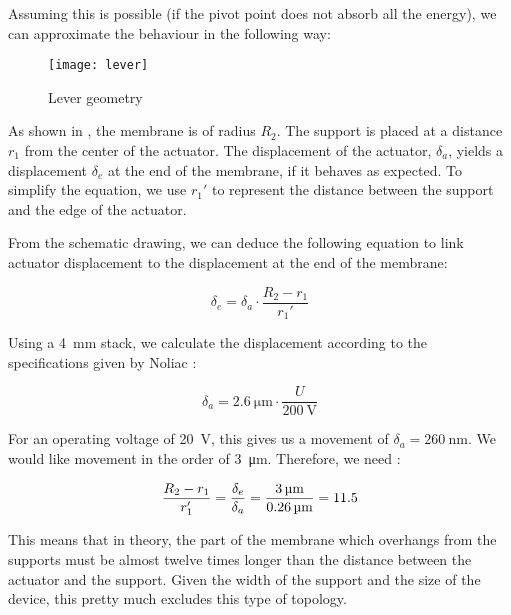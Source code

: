 Assuming this is possible (if the pivot point does not absorb all the energy),
we can approximate the behaviour in the following way:

\begin{figure}[h]
  \begin{center}
    \texttt{[image: lever]}
  \end{center}
  \caption{Lever geometry}
  \label{fig:lever}
\end{figure}

As shown in , the membrane is of radius $R_2$. The support is
placed at a distance $r_1$ from the center of the actuator.  The displacement of
the actuator, $\delta_a$, yields a displacement $\delta_e$ at the end of the
membrane, if it behaves as expected. To simplify the equation, we use $r_1'$ to
represent the distance between the support and the edge of the actuator.

From the schematic drawing, we can deduce the following equation to link
actuator displacement to the displacement at the end of the membrane:

\begin{equation}
  \delta_e = \delta_a \cdot \frac{R_2-r_1}{r_1'}
  \label{eq:displacement}
\end{equation}

Using a \SI{4}{\milli\metre} stack, we calculate the displacement according to
the specifications given by Noliac :

\begin{equation}
  \delta_a = \SI{2.6}{\micro\metre} \cdot \frac{U}{\SI{200}{\volt}}
  \label{eq:delta-a}
\end{equation}

For an operating voltage of \SI{20}{\volt}, this gives us a movement of
$\delta_a = \SI{260}{\nano\metre}$. We would like movement in the order of
\SI{3}{\micro\metre}. Therefore, we need :

\begin{equation}
  \frac{R_2 - r_1}{r_1'} = \frac{\delta_e}{\delta_a} = 
  {\SI{3}{\micro\metre} \over \SI{0.26}{\micro\metre}} = 11.5
  \label{eq:11-5}
\end{equation}

This means that in theory, the part of the membrane which overhangs from the
supports must be almost twelve times longer than the distance between the
actuator and the support. Given the width of the support and the size of the
device, this pretty much excludes this type of topology.
